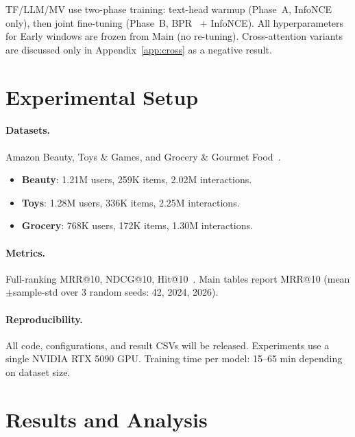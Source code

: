 \documentclass[sigconf,natbib=true,anonymous]{acmart}
\begin{document}
TF/LLM/MV use two-phase training: text-head warmup (Phase~A, InfoNCE only), then joint fine-tuning (Phase~B, BPR~\cite{rendle2009bpr} + InfoNCE).
All hyperparameters for Early windows are frozen from Main (no re-tuning).
Cross-attention variants are discussed only in Appendix~\ref{app:cross} as a negative result.

\section{Experimental Setup}
\label{sec:setup}

\paragraph{Datasets.}
Amazon Beauty, Toys \& Games, and Grocery \& Gourmet Food~\cite{mcauley2015amazon,ni2019amazon}.
\begin{itemize}[leftmargin=*,itemsep=1pt]
\item \textbf{Beauty}: 1.21M users, 259K items, 2.02M interactions.
\item \textbf{Toys}: 1.28M users, 336K items, 2.25M interactions.
\item \textbf{Grocery}: 768K users, 172K items, 1.30M interactions.
\end{itemize}

\paragraph{Metrics.}
Full-ranking MRR@10, NDCG@10, Hit@10~\cite{krichene2020sampledmetrics}.
Main tables report MRR@10 (mean$\pm$sample-std over 3 random seeds: 42, 2024, 2026).

\paragraph{Reproducibility.}
All code, configurations, and result CSVs will be released.
Experiments use a single NVIDIA RTX 5090 GPU.
Training time per model: 15--65 min depending on dataset size.

\section{Results and Analysis}
\label{sec:results}
\end{document}
